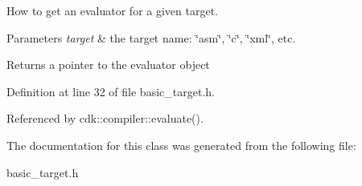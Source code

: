 How to get an evaluator for a given target. 
\begin{DoxyParams}{Parameters}
{\em target} & the target name\+: \char`\"{}asm\char`\"{}, \char`\"{}c\char`\"{}, \char`\"{}xml\char`\"{}, etc. \\
\hline
\end{DoxyParams}
\begin{DoxyReturn}{Returns}
a pointer to the evaluator object 
\end{DoxyReturn}


Definition at line 32 of file basic\+\_\+target.\+h.



Referenced by cdk\+::compiler\+::evaluate().



The documentation for this class was generated from the following file\+:\begin{DoxyCompactItemize}
\item 
basic\+\_\+target.\+h\end{DoxyCompactItemize}
